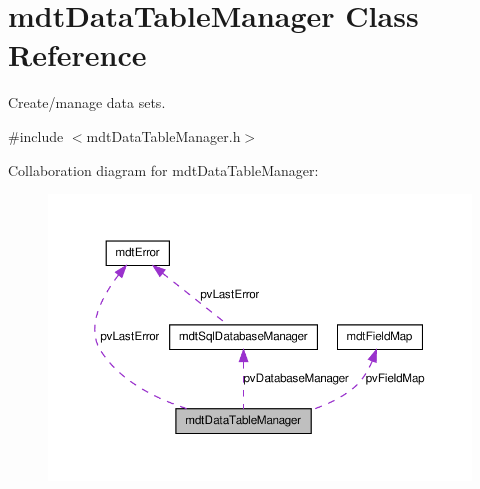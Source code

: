 \hypertarget{classmdt_data_table_manager}{
\section{mdtDataTableManager Class Reference}
\label{classmdt_data_table_manager}
}


Create/manage data sets.  




{\ttfamily \#include $<$mdtDataTableManager.h$>$}



Collaboration diagram for mdtDataTableManager:\nopagebreak
\begin{figure}[H]
\begin{center}
\leavevmode
\includegraphics[width=364pt]{classmdt_data_table_manager__coll__graph}
\end{center}
\end{figure}
